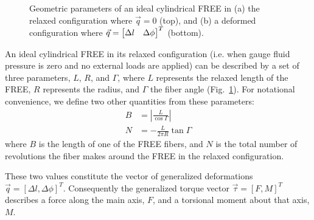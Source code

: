 \begin{figure}
    \centering
    \caption{Geometric parameters of an ideal cylindrical FREE in (a) the relaxed configuration where ${\vec{q}=0}$ (top), and (b) a deformed configuration where ${\vec{q} = \begin{bmatrix} \Delta l & \Delta \phi \end{bmatrix}^T}$ (bottom).}
    \label{fig:FREEparams}
\end{figure}

An ideal cylindrical FREE in its relaxed configuration (i.e. when gauge fluid pressure is zero and no external loads are applied) can be described by a set of three parameters, $L$, $R$, and $\Gamma$, where $L$ represents the relaxed length of the FREE, $R$ represents the radius, and $\Gamma$ the fiber angle (Fig.~\ref{fig:FREEparams}). 
For notational convenience, we define two other quantities from these parameters:
\begin{align}
	B &= \left| \frac{L}{\cos{\Gamma}} \right| \\
	N &= - \frac{L}{2 \pi R} \tan{\Gamma}
\end{align}
where $B$ is the length of one of the FREE fibers, and $N$ is the total number of revolutions the fiber makes around the FREE in the relaxed configuration. 

These two values constitute the vector of generalized deformations $\vec{q} = \left[ \Delta l, \Delta \phi \right]^T$.
Consequently the generalized torque vector $\vec{\tau} = \left[ F, M \right]^T$ describes a force along the main axis, $F$, and a torsional moment about that axis, $M$.

